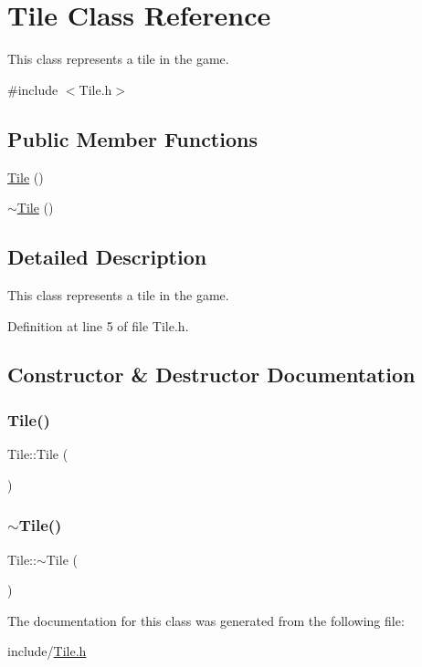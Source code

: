 \hypertarget{class_tile}{}\section{Tile Class Reference}
\label{class_tile}


This class represents a tile in the game.  




{\ttfamily \#include $<$Tile.\+h$>$}

\subsection*{Public Member Functions}
\begin{DoxyCompactItemize}
\item 
\mbox{\hyperlink{class_tile_aeeb5593bb6b75aae2edfcccbc84ab378}{Tile}} ()
\item 
\mbox{\hyperlink{class_tile_a98634abbd93fa13d0578d7103202d03d}{$\sim$\+Tile}} ()
\end{DoxyCompactItemize}


\subsection{Detailed Description}
This class represents a tile in the game. 

Definition at line 5 of file Tile.\+h.



\subsection{Constructor \& Destructor Documentation}
\mbox{\label{class_tile_aeeb5593bb6b75aae2edfcccbc84ab378}} 
\subsubsection{\texorpdfstring{Tile()}{Tile()}}
{\footnotesize\ttfamily Tile\+::\+Tile (\begin{DoxyParamCaption}{ }\end{DoxyParamCaption})}

\mbox{\label{class_tile_a98634abbd93fa13d0578d7103202d03d}} 
\subsubsection{\texorpdfstring{$\sim$Tile()}{~Tile()}}
{\footnotesize\ttfamily Tile\+::$\sim$\+Tile (\begin{DoxyParamCaption}{ }\end{DoxyParamCaption})}



The documentation for this class was generated from the following file\+:\begin{DoxyCompactItemize}
\item 
include/\mbox{\hyperlink{_tile_8h}{Tile.\+h}}\end{DoxyCompactItemize}
